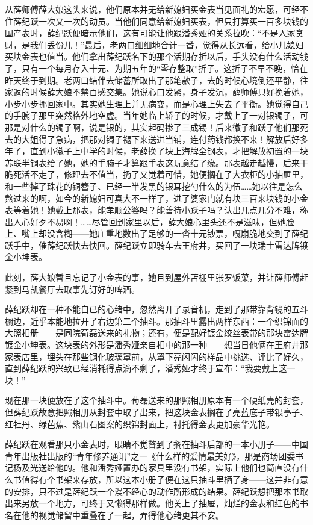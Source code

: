 \par 从薛师傅薛大娘这头来说，他们原本并无给新媳妇买金表当见面礼的宏愿，可经不住薛纪跃一次又一次的动员。当他们同意给新媳妇买表，但只打算买一百多块钱的国产表时，薛纪跃便暗示他们，这有可能让他跟潘秀娅的关系拉吹：“不是人家贪财，是我们丢份儿！”最后，老两口细细地合计一番，觉得从长远看，给小儿媳妇买块金表也值当。他们拿出薛纪跃名下的那个活期存折以后，手头没有什么活动钱了，只有一个每月存入十元、为期五年的“零存整取”折子。这折子不早不晚，恰在昨天终于到期。老两口结伴去储蓄所取出了那笔款子，去的时候心境倒还平静，往家返的时候薛大娘不禁百感交集。她说心口发紧，身子发沉，薛师傅只好挽着她，小步小步挪回家中。其实她生理上并无病变，而是心理上失去了平衡。她觉得自己的手腕子那里突然格外地空虚。当年她临上轿子的时候，才戴上了一对银镯子，可那是对什么的镯子啊，说是银的，其实起码掺了三成锡！后来徽子和跃子他们那死去的大姐得了急病，把那对镯子褪下来送进当铺，连付药钱都换不来！解放后好多年了，直到小徽子上中学的时候，老薛换了块上海牌全钢表，才把解放初置的一块苏联半钢表给了她，她的手腕子才算跟手表这玩意结了缘。那表越走越慢，后来干脆死活不走了，修理去不值当，扔了又觉着可惜，她便搁在了大衣柜的小抽屉里，和一些掉了珠花的铜簪子、已经一半发黑的银耳挖勺什么的为伍……她以往是怎么熬过来的啊，如今的新媳妇可真大不一样了，进了婆家门就有块三百来块钱的小金表等着她！她戴上那表，能孝顺公婆吗？能善待小跃子吗？认出几点几分不难，称出人心好歹不易啊！……尽管回到家里以后，薛大娘心里头还不是滋味，但她脸上、嘴上却没含糊——她庄重地数出了足够的一沓十元钞票，嘎崩脆地交到了薛纪跃手中，催薛纪跃快去快回。薛纪跃立即骑车去王府井，买回了一块瑞士雷达牌镀金小坤表。
\par 此刻，薛大娘暂且忘记了小金表的事，她且到屋外苫棚里张罗饭菜，并让薛师傅赶紧到马凯餐厅去取事先订好的啤酒。
\par 薛纪跃却在一种不能自已的心绪中，忽然离开了录音机，走到了那带靠背镜的五斗橱边，近乎本能地拉开了右边第二个抽斗。那抽斗里露出两样东西：一个织锦面的大照相册——是同院荀磊送来的礼物；还有，便是配好镀金绞丝表带的那块雷达牌镀金小坤表。这块表的外形是潘秀娅亲自相中的那一种——想当日他俩在王府井那家表店里，埋头在那些钢化玻璃罩前，从罩下亮闪闪的样品中挑选、评比了好久，直到薛纪跃的兴致已经消耗得点滴不剩了，潘秀娅才终于宣布：“我要戴上这一块！”
\par 现在那一块便放在了这个抽斗中。荀磊送来的那照相册原本有一个硬纸壳的封套，但薛纪跃故意把照相册从封套中取了出来，把这块金表搁在了亮蓝底子带银亭子、红牡丹、绿芭蕉、紫山石图案的织锦封面上，衬托得金表更加豪华光艳。
\par 薛纪跃在观看那只小金表时，眼睛不觉瞥到了搁在抽斗后部的一本小册子——中国青年出版社出版的“青年修养通讯”之一《什么样的爱情最美好》，那是商场团委书记杨及光送给他的。他和潘秀娅置办的家具里没有书架，实际上他们也简直没有什么书值得有个书架来存放，所以这本小册子便在这只抽斗里栖了身——这并非有意的安排，只不过是薛纪跃一个漫不经心的动作所形成的结果。薛纪跃想把那本书取出来另放一个地方，可终于又懒得那样做。他关上了抽屉，灿烂的金表和红色的书名在他的视觉储留中重叠在了一起，弄得他心绪更其不安。
